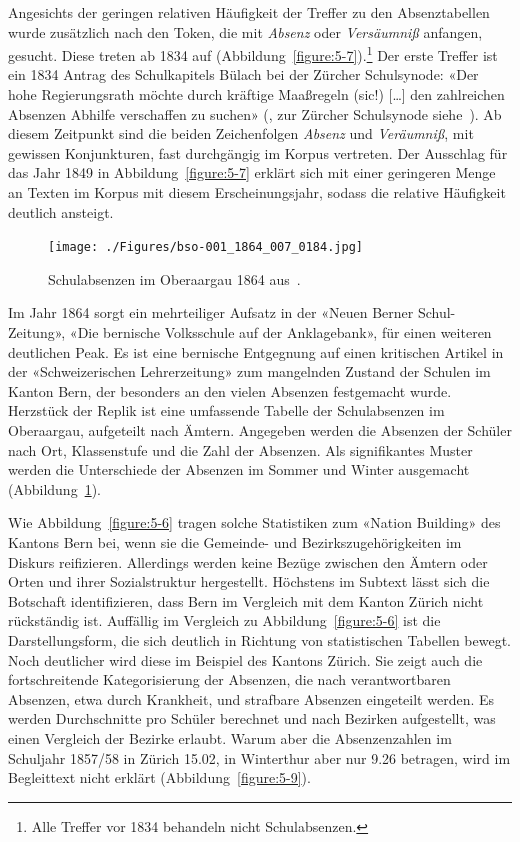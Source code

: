 Angesichts der geringen relativen Häufigkeit der Treffer zu den Absenztabellen wurde zusätzlich nach den Token, die mit \textit{Absenz} oder \textit{Versäumniß} anfangen, gesucht. Diese treten ab 1834 auf (Abbildung~\ref{figure:5-7}).\footnote{Alle Treffer vor 1834 behandeln nicht Schulabsenzen.}  Der erste Treffer ist ein 1834 Antrag des Schulkapitels Bülach bei der Zürcher Schulsynode: «Der hohe Regierungsrath möchte durch kräftige Maaßregeln (sic!) […] den zahlreichen Absenzen Abhilfe verschaffen zu suchen» (\cite[30]{noauthor_general-bericht_1834}, zur Zürcher Schulsynode siehe~\cite{trohler_zurcher_2007}). Ab diesem Zeitpunkt sind die beiden Zeichenfolgen \textit{Absenz} und \textit{Veräumniß}, mit gewissen Konjunkturen, fast durchgängig im Korpus vertreten. Der Ausschlag für das Jahr 1849 in Abbildung~\ref{figure:5-7} erklärt sich mit einer geringeren Menge an Texten im Korpus mit diesem Erscheinungsjahr, sodass die relative Häufigkeit deutlich ansteigt. 

\begin{figure}[!ht]
    \centering
    \texttt{[image: ./Figures/bso-001\_1864\_007\_0184.jpg]}
    \caption{Schulabsenzen im Oberaargau 1864 aus~\cite[184]{noauthor_bernische_1864}.}
    \label{figure:5-8}
\end{figure}

\pagebreak

Im Jahr 1864 sorgt ein mehrteiliger Aufsatz in der «Neuen Berner Schul-Zeitung», «Die bernische Volksschule auf der Anklagebank», für einen weiteren deutlichen Peak. Es ist eine bernische Entgegnung auf einen kritischen Artikel in der «Schweizerischen Lehrerzeitung» zum mangelnden Zustand der Schulen im Kanton Bern, der besonders an den vielen Absenzen festgemacht wurde. Herzstück der Replik ist eine umfassende Tabelle der Schulabsenzen im Oberaargau, aufgeteilt nach Ämtern. Angegeben werden die Absenzen der Schüler nach Ort, Klassenstufe und die Zahl der Absenzen. Als signifikantes Muster werden die Unterschiede der Absenzen im Sommer und Winter ausgemacht (Abbildung~\ref{figure:5-8}). 

Wie Abbildung~\ref{figure:5-6} tragen solche Statistiken zum «Nation Building» des Kantons Bern bei, wenn sie die Gemeinde- und Bezirkszugehörigkeiten im Diskurs reifizieren. Allerdings werden keine Bezüge zwischen den Ämtern oder Orten und ihrer Sozialstruktur hergestellt. Höchstens im Subtext lässt sich die Botschaft identifizieren, dass Bern im Vergleich mit dem Kanton Zürich nicht rückständig ist. Auffällig im Vergleich zu Abbildung~\ref{figure:5-6} ist die Darstellungsform, die sich deutlich in Richtung von statistischen Tabellen bewegt. Noch deutlicher wird diese im Beispiel des Kantons Zürich. Sie zeigt auch die fortschreitende Kategorisierung der Absenzen, die nach verantwortbaren Absenzen, etwa durch Krankheit, und strafbare Absenzen eingeteilt werden. Es werden Durchschnitte pro Schüler berechnet und nach Bezirken aufgestellt, was einen Vergleich der Bezirke erlaubt. Warum aber die Absenzenzahlen im Schuljahr 1857/58 in Zürich 15.02, in Winterthur aber nur 9.26 betragen, wird im Begleittext nicht erklärt (Abbildung~\ref{figure:5-9}).

